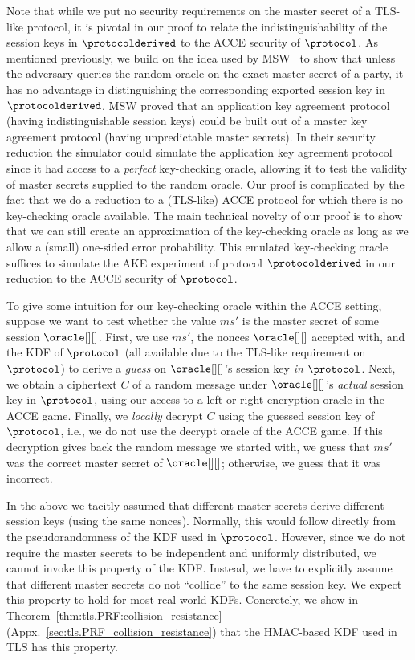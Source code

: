 Note that while we put no security requirements on the master secret of a TLS-like protocol,
it is pivotal in our proof to relate the indistinguishability of the session keys in $\protocolderived$ to the ACCE security of $\protocol$.
As mentioned previously,
we build on the idea used by MSW~\cite{JC:MorSmaWar10} to 
show that unless the adversary queries the random oracle on the exact master secret of a party,
it has no advantage in distinguishing the corresponding exported session key in $\protocolderived$.
MSW proved that an application key agreement protocol 
(having indistinguishable session keys) could be built out of a master key agreement protocol
(having unpredictable master secrets).  
In their security reduction
the simulator could simulate the application key agreement protocol since it had access to a \emph{perfect} key-checking oracle,
allowing it to test the validity of master secrets supplied to the random oracle. 
Our proof is complicated by the fact that we do a reduction to a (TLS-like) ACCE protocol for which there is no key-checking oracle available.
The main technical novelty of our proof is to show that we can still create an approximation of the key-checking oracle as long as we allow a (small) one-sided error probability.
This emulated key-checking oracle suffices to simulate the AKE experiment of protocol $\protocolderived$ in our reduction to the ACCE security of $\protocol$.

To give some intuition for our key-checking oracle within the ACCE setting,
suppose we want to test whether the value  $ms'$ is the master secret of some session $\oracle[][]$.
First, 
we use $ms'$,
the nonces $\oracle[][]$ accepted with,
and the KDF of $\protocol$
(all available due to the TLS-like requirement on $\protocol$)
to derive a \emph{guess} on $\oracle[][]$'s session key \emph{in $\protocol$}.
Next, we obtain a ciphertext $C$ of a random message under $\oracle[][]$'s \emph{actual} session key in $\protocol$,
using our access to a left-or-right encryption oracle in the ACCE game. 
Finally,
we \emph{locally} decrypt $C$ using the guessed session key of $\protocol$, 
i.e., we do not use the decrypt oracle of the ACCE game.
If this decryption gives back the random message we started with, 
we guess that $ms'$ was the correct master secret of $\oracle[][]$;
otherwise, we guess that it was incorrect.

In the above we tacitly assumed that different master secrets derive different session keys 
(using the same nonces).
Normally,
this would follow directly from the pseudorandomness of the KDF used in $\protocol$.
However,
since we do not require the master secrets to be independent and uniformly distributed,
we cannot invoke this property of the KDF.
Instead, 
we have to explicitly assume that different master secrets do not ``collide'' to the same session key.
We expect this property to hold for most real-world KDFs.
Concretely,
we show in Theorem~\ref{thm:tls.PRF:collision_resistance} (Appx.~\ref{sec:tls.PRF_collision_resistance})
that the HMAC-based KDF used in TLS has this property.
 



